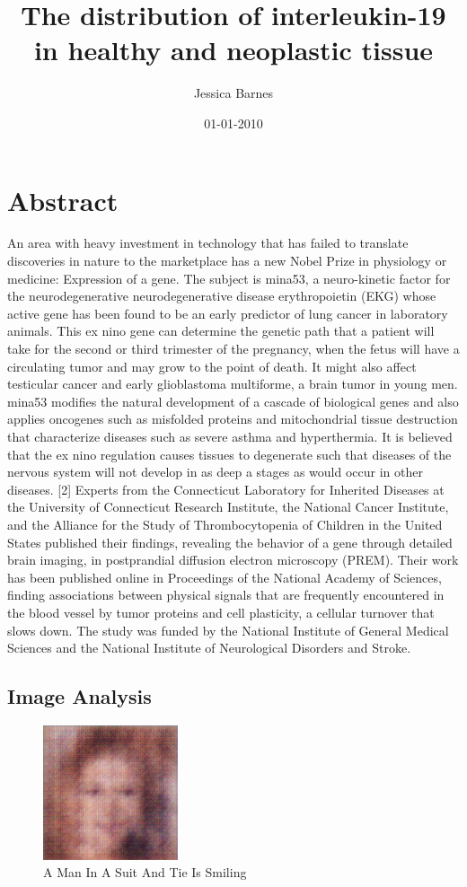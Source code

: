 \documentclass{article}%
\title{The distribution of interleukin{-}19 in healthy and neoplastic tissue}%
\author{Jessica Barnes}%
\affil{Department of Pathology, Microbiology and Immunology, School of Medicine, University of South Carolina, Columbia, South Carolina, United States of America}%
\date{01{-}01{-}2010}%
\begin{document}
%
\normalsize%
\maketitle%
\section{Abstract}%
\label{sec:Abstract}%
An area with heavy investment in technology that has failed to translate discoveries in nature to the marketplace has a new Nobel Prize in physiology or medicine: Expression of a gene. The subject is mina53, a neuro{-}kinetic factor for the neurodegenerative neurodegenerative disease erythropoietin (EKG) whose active gene has been found to be an early predictor of lung cancer in laboratory animals. This ex nino gene can determine the genetic path that a patient will take for the second or third trimester of the pregnancy, when the fetus will have a circulating tumor and may grow to the point of death. It might also affect testicular cancer and early glioblastoma multiforme, a brain tumor in young men.\newline%
mina53 modifies the natural development of a cascade of biological genes and also applies oncogenes such as misfolded proteins and mitochondrial tissue destruction that characterize diseases such as severe asthma and hyperthermia. It is believed that the ex nino regulation causes tissues to degenerate such that diseases of the nervous system will not develop in as deep a stages as would occur in other diseases. {[}2{]}\newline%
Experts from the Connecticut Laboratory for Inherited Diseases at the University of Connecticut Research Institute, the National Cancer Institute, and the Alliance for the Study of Thrombocytopenia of Children in the United States published their findings, revealing the behavior of a gene through detailed brain imaging, in postprandial diffusion electron microscopy (PREM). Their work has been published online in Proceedings of the National Academy of Sciences, finding associations between physical signals that are frequently encountered in the blood vessel by tumor proteins and cell plasticity, a cellular turnover that slows down. The study was funded by the National Institute of General Medical Sciences and the National Institute of Neurological Disorders and Stroke.

%
\subsection{Image Analysis}%
\label{subsec:ImageAnalysis}%


\begin{figure}[h!]%
\centering%
\includegraphics[width=150px]{500_fake_images/samples_5_225.png}%
\caption{A Man In A Suit And Tie Is Smiling}%
\end{figure}

%
\end{document}
